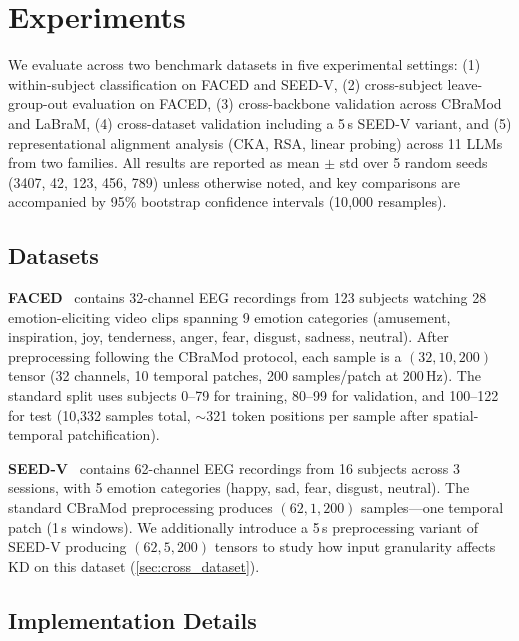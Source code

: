\section{Experiments}
\label{sec:experiments}
\vspace{-1mm}

We evaluate \ours across two benchmark datasets in five experimental settings: (1) within-subject classification on FACED and SEED-V, (2) cross-subject leave-group-out evaluation on FACED, (3) cross-backbone validation across CBraMod and LaBraM, (4) cross-dataset validation including a 5\,s SEED-V variant, and (5) representational alignment analysis (CKA, RSA, linear probing) across 11 LLMs from two families. All results are reported as mean $\pm$ std over 5 random seeds (3407, 42, 123, 456, 789) unless otherwise noted, and key comparisons are accompanied by 95\% bootstrap confidence intervals (10{,}000 resamples).

\subsection{Datasets}
\label{sec:datasets}
\vspace{-1mm}

\noindent\textbf{FACED}~\cite{chen2023faced} contains 32-channel EEG recordings from 123 subjects watching 28 emotion-eliciting video clips spanning 9 emotion categories (amusement, inspiration, joy, tenderness, anger, fear, disgust, sadness, neutral). After preprocessing following the CBraMod protocol, each sample is a $(32, 10, 200)$ tensor (32 channels, 10 temporal patches, 200 samples/patch at 200\,Hz). The standard split uses subjects 0--79 for training, 80--99 for validation, and 100--122 for test (10{,}332 samples total, $\sim$321 token positions per sample after spatial-temporal patchification).

\noindent\textbf{SEED-V}~\cite{seedv2022} contains 62-channel EEG recordings from 16 subjects across 3 sessions, with 5 emotion categories (happy, sad, fear, disgust, neutral). The standard CBraMod preprocessing produces $(62, 1, 200)$ samples---one temporal patch (1\,s windows). We additionally introduce a 5\,s preprocessing variant of SEED-V producing $(62, 5, 200)$ tensors to study how input granularity affects KD on this dataset (\cref{sec:cross_dataset}).

\subsection{Implementation Details}
\vspace{-1mm}

